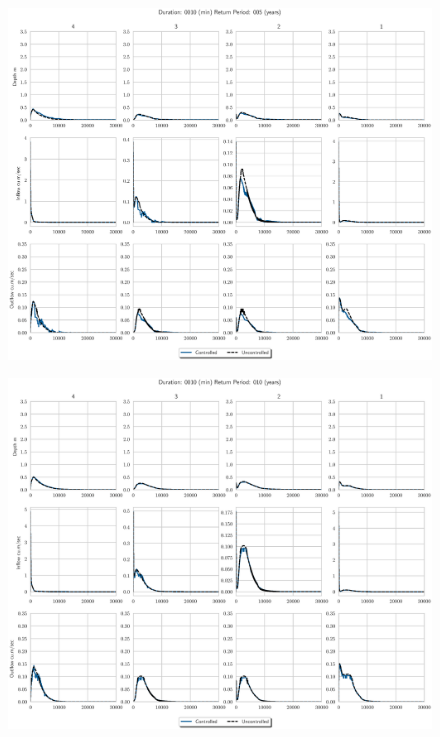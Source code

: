\begin{figure}
    \centering
    \includegraphics[width=\linewidth]{./RL-SI-figures/77storms/0010005.eps}
\end{figure}
\begin{figure}
    \centering
    \includegraphics[width=\linewidth]{./RL-SI-figures/77storms/0010010.eps}
\end{figure}
